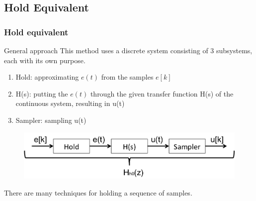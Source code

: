\subsection{Hold Equivalent}
\begin{frame}
	\frametitle{Hold equivalent}
	\begin{block}{General approach}
		This method uses a discrete system consisting of 3 subsystems, each with its own purpose. 
		\begin{enumerate}
			\item Hold: approximating $e(t)$ from the samples $e[k]$
			\item H(s): putting the $e(t)$ through the given transfer function H(s) of the continuous system, resulting in u(t)
			\item Sampler: sampling u(t) 
		\end{enumerate}
		\vspace{-1em}
		\begin{figure}
			\centering
			\includegraphics[width=0.8\linewidth]{hold_equivalent}
		\end{figure}
		\vspace{-1em}
		There are many techniques for holding a sequence of samples.
	\end{block}
\end{frame}

